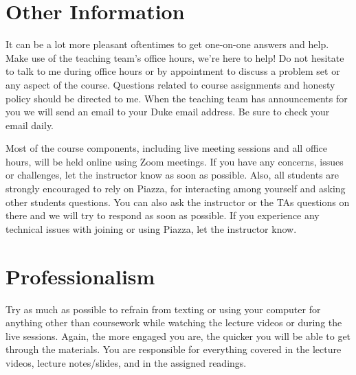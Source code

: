 \documentclass[11pt, a4paper]{article}
\begin{document}
\section{Other Information} 
It can be a lot more pleasant oftentimes to get one-on-one answers and help. Make use of the teaching team's office hours, we're here to help! Do not hesitate to talk to me during office hours or by appointment to discuss a problem set or any aspect of the course.  Questions related to course assignments and honesty policy should be directed to me. When the teaching team has announcements for you we will send an email to your Duke email address. Be sure to check your email daily.

Most of the course components, including live meeting sessions and all office hours, will be held online using Zoom meetings. If you have any concerns, issues or challenges, let the instructor know as soon as possible. Also, all students are strongly encouraged to rely on Piazza, for interacting among yourself and asking other students questions. You can also ask the instructor or the TAs questions on there and we will try to respond as soon as possible.  If you experience any technical issues with joining or using Piazza, let the instructor know.


\section{Professionalism}
Try as much as possible to refrain from texting or using your computer for anything other than coursework while watching the lecture videos or during the live sessions. Again, the more engaged you are, the quicker you will be able to get through the materials. You are responsible for everything covered in the lecture videos, lecture notes/slides, and in the assigned readings.
\end{document}
